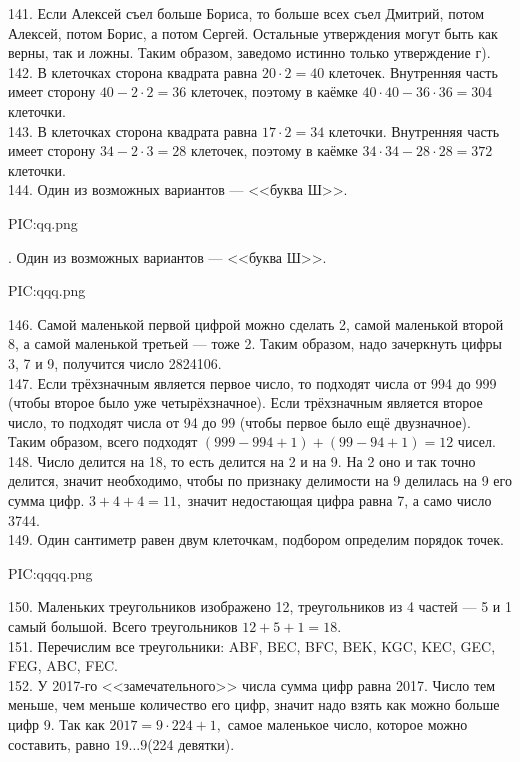 141. Если Алексей съел больше Бориса, то больше всех съел Дмитрий, потом Алексей, потом Борис, а потом Сергей. Остальные утверждения могут быть как верны, так и ложны. Таким образом, заведомо истинно только утверждение г).\\
142. В клеточках сторона квадрата равна $20\cdot2=40$ клеточек. Внутренняя часть имеет сторону $40-2\cdot2=36$ клеточек, поэтому в каёмке $40\cdot40-36\cdot36=304$ клеточки.\\
143. В клеточках сторона квадрата равна $17\cdot2=34$ клеточки. Внутренняя часть имеет сторону $34-2\cdot3=28$ клеточек, поэтому в каёмке $34\cdot34-28\cdot28=372$ клеточки.\\
144. Один из возможных вариантов --- <<буква Ш>>.
\begin{center}
{{PIC:qq.png}}
\end{center}\newpage{}. Один из возможных вариантов --- <<буква Ш>>.
\begin{center}
{{PIC:qqq.png}}
\end{center}
146. Самой маленькой первой цифрой можно сделать 2, самой маленькой второй 8, а самой маленькой третьей --- тоже 2. Таким образом, надо зачеркнуть цифры 3, 7 и 9, получится число 2824106.\\
147. Если трёхзначным является первое число, то подходят числа от 994 до 999 (чтобы второе было уже четырёхзначное). Если трёхзначным является второе число, то подходят числа от 94 до 99 (чтобы первое было ещё двузначное). Таким образом, всего подходят $(999-994+1)+(99-94+1)=12$ чисел.\\
148. Число делится на 18, то есть делится на 2 и на 9. На 2 оно и так точно делится, значит необходимо, чтобы по признаку делимости на 9 делилась на 9 его сумма цифр. $3+4+4=11,$ значит недостающая цифра равна 7, а само число 3744.\\
149. Один сантиметр равен двум клеточкам, подбором определим порядок точек.
\begin{center}
{{PIC:qqqq.png}}
\end{center}
150. Маленьких треугольников изображено 12, треугольников из 4 частей --- 5 и 1 самый большой. Всего треугольников $12+5+1=18.$\\
151. Перечислим все треугольники: ABF, BEC, BFC, BEK, KGC, KEC, GEC, FEG, ABC, FEC.\\
152. У 2017-го <<замечательного>> числа сумма цифр равна 2017. Число тем меньше, чем меньше количество его цифр, значит надо взять как можно больше цифр 9. Так как
$2017=9\cdot224+1,$ самое маленькое число, которое можно составить, равно $19\ldots9$(224 девятки).\\

